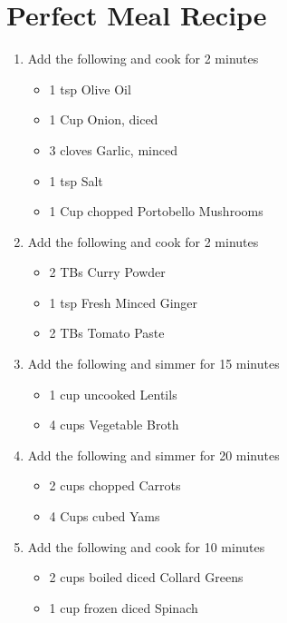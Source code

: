 \documentclass[a4paper,12pt]{book}
\begin{document}


\section{Perfect Meal Recipe}
\begin{enumerate}[label=\Roman*,font=\bfseries]
    \item Add the following and cook for 2 minutes
    \begin{itemize}
        \item 1 tsp Olive Oil
        \item 1 Cup Onion, diced
        \item 3 cloves Garlic, minced
        \item 1 tsp Salt
        \item 1 Cup chopped Portobello Mushrooms
    \end{itemize}
    \item Add the following and cook for 2 minutes
    \begin{itemize}
        \item 2 TBs Curry Powder
        \item 1 tsp Fresh Minced Ginger
        \item 2 TBs Tomato Paste
    \end{itemize}
    \item Add the following and simmer for 15 minutes
    \begin{itemize}
        \item 1 cup uncooked Lentils
        \item 4 cups Vegetable Broth
    \end{itemize}
    \item Add the following and simmer for 20 minutes
    \begin{itemize}
        \item 2 cups chopped Carrots
        \item 4 Cups cubed Yams
    \end{itemize}
    \item Add the following and cook for 10 minutes
    \begin{itemize}
        \item 2 cups boiled diced Collard Greens
        \item 1 cup frozen diced Spinach
    \end{itemize}
\end{enumerate}
\bigskip
\end{document}
